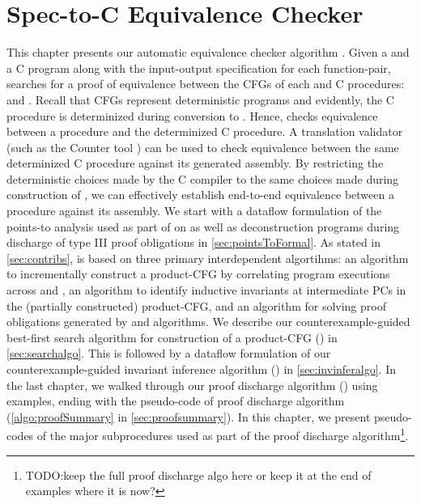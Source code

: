 \chapter{Spec-to-C Equivalence Checker}
\label{sec:spectocalgo}
This chapter presents our automatic equivalence checker algorithm \toolName{}.
Given a \SpecL{} and a C program along with the input-output specification for each function-pair,
\toolName{} searches for a proof of equivalence between the CFGs of each \SpecL{} and C procedures: \sprog{} and \cprog{}.
Recall that CFGs represent deterministic programs and evidently, the C procedure is determinized during conversion to \cprog{}.
Hence, \toolName{} checks equivalence between a \SpecL{} procedure and the determinized C procedure.
A translation validator (such as the Counter tool \cite{oopsla20}) can be used to check equivalence between
the same determinized C procedure against its generated assembly.
By restricting the deterministic choices made by the C compiler to the same choices made during construction of \cprog{},
we can effectively establish end-to-end equivalence between a \SpecL{} procedure against its assembly.
We start with a dataflow formulation of the points-to analysis used as part of \toolName{} on \cprog{} as well as
deconstruction programs during discharge of type III proof obligations in \cref{sec:pointsToFormal}.
As stated in \cref{sec:contribs}, \toolName{} is based on three primary interdependent algortihms:
 an algorithm to incrementally construct a product-CFG by correlating program executions across
\sprog{} and \cprog{},
 an algorithm to identify inductive invariants at intermediate PCs in the (partially constructed)
product-CFG, and
 an algorithm for solving proof obligations generated by  and  algorithms.
We describe our counterexample-guided best-first search algorithm for construction of a product-CFG () in \cref{sec:searchalgo}.
This is followed by a dataflow formulation of our counterexample-guided invariant inference algorithm () in \cref{sec:invinferalgo}.
In the last chapter, we walked through our proof discharge algorithm () using examples, ending with
the pseudo-code of proof discharge algorithm (\cref{algo:proofSummary} in \cref{sec:proofsummary}).
In this chapter, we present pseudo-codes of the major subprocedures used as part of
the proof discharge algorithm\footnote{TODO:keep the full proof discharge algo here or keep it at the end of examples where it is now?}.



